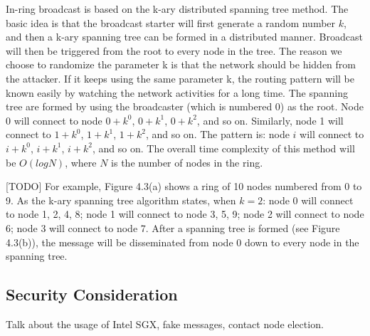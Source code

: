 In-ring broadcast is based on the k-ary distributed spanning tree method. The basic idea is that the broadcast starter will first generate a random number $k$, and then a k-ary spanning tree can be formed in a distributed manner. Broadcast will then be triggered from the root to every node in the tree. The reason we choose to randomize the parameter k is that the network should be hidden from the attacker. If it keeps using the same parameter k, the routing pattern will be known easily by watching the network activities for a long time. The spanning tree are formed by using the broadcaster (which is numbered 0) as the root. Node 0 will connect to node $0+k^0$, $0+k^1$, $0+k^2$, and so on. Similarly, node 1 will connect to $1+k^0$, $1+k^1$, $1+k^2$, and so on. The pattern is: node $i$ will connect to $i+k^0$, $i+k^1$, $i+k^2$, and so on. The overall time complexity of this method will be $O(logN)$, where $N$ is the number of nodes in the ring.

[TODO] For example, Figure 4.3(a) shows a ring of 10 nodes numbered from 0 to 9. As the k-ary spanning tree algorithm states, when $k=2$: node 0 will connect to node 1, 2, 4, 8; node 1 will connect to node 3, 5, 9; node 2 will connect to node 6; node 3 will connect to node 7. After a spanning tree is formed (see Figure 4.3(b)), the message will be disseminated from node 0 down to every node in the spanning tree.

\subsection{Security Consideration} \label{security}

Talk about the usage of Intel SGX, fake messages, contact node election.